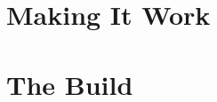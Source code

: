 \documentclass[11pt,a4paper]{report}
\begin{document}

\part{Making It Work}





\part{The Build}








\end{document}
